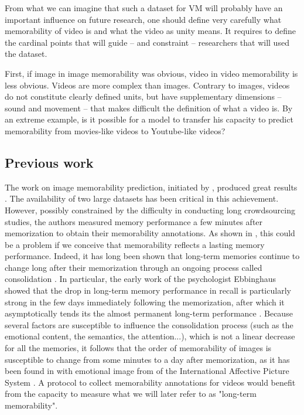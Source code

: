 \documentclass[sigconf]{acmart}
\begin{document}
From what we can imagine that such a dataset for VM will probably have an important influence on future research, one should define very carefully what memorability of video is and what the video as unity means.
It requires to define the cardinal points that will guide -- and constraint -- researchers that will used the dataset.

First, if image in image memorability was obvious, video in video memorability is less obvious.
Videos are more complex than images. Contrary to images, videos do not constitute clearly defined units, but have supplementary dimensions -- sound and movement -- that makes difficult the definition of what a video is.
By an extreme example, is it possible for a model to transfer his capacity to predict memorability from movies-like videos to Youtube-like videos?

\subsection{Previous work} %
The work on image memorability prediction, initiated by \cite{isola_2011_makes}, produced great results \cite{khosla_2015_understanding,baveye_2016_deep,squalli_2017_deep}.
The availability of two large datasets \cite{isola_2011_makes,khosla_2015_understanding} has been critical in this achievement. 
However, possibly constrained by the difficulty in conducting long crowdsourcing studies, the authors measured memory performance a few minutes after memorization to obtain their memorability annotations.
As shown in \cite{cohendet_2016_prediction}, this could be a problem if we conceive that memorability reflects a lasting memory performance.
Indeed, it has long been shown that long-term memories continue to change long after their memorization through an ongoing process called consolidation \cite{mcgaugh_2000_memory}.
In particular, the early work of the psychologist Ebbinghaus showed that the drop in long-term memory performance in recall is particularly strong in the few days immediately following the memorization, after which it asymptotically tends its the almost permanent long-term performance \cite{ebbinghaus_1913_memory}.
Because several factors are susceptible to influence the consolidation process (such as the emotional content, the semantics, the attention...), which is not a linear decrease for all the memories, it follows that the order of memorability of images is susceptible to change from some minutes to a day after memorization, as it has been found in \cite{cohendet_2016_prediction} with emotional image from of the International Affective Picture System \cite{lang_2005_international}.
A protocol to collect memorability annotations for videos would benefit from the capacity to measure what we will later refer to as "long-term memorability".
\end{document}

